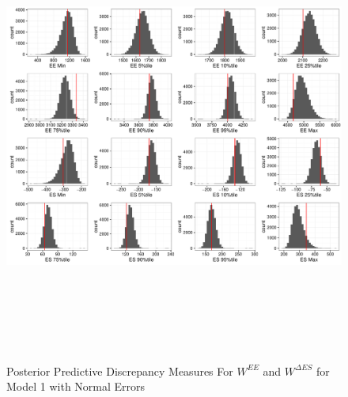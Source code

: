 \documentclass[11pt]{article}\usepackage[]{graphicx}\usepackage[]{color}
\begin{document}
  \begin{figure}
  \centering
  \includegraphics[width=17cm,height=15cm]{manual_figure/wpwdiag1.pdf}
  \caption{Posterior Predictive Discrepancy Measures For $W^{EE}$ and $W^{\Delta ES}$ for Model 1 with Normal Errors}
  \label{wpwdiag1}
  \end{figure}
\end{document}
